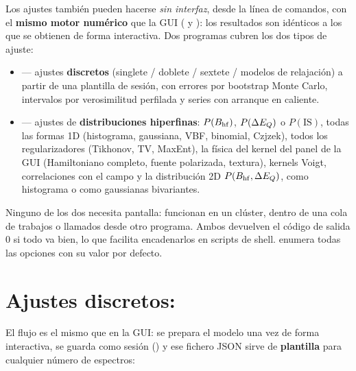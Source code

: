 
Los ajustes también pueden hacerse \emph{sin interfaz}, desde la línea de
comandos, con el \textbf{mismo motor numérico} que la GUI
( y ): los resultados son
idénticos a los que se obtienen de forma interactiva. Dos programas cubren los
dos tipos de ajuste:

\begin{itemize}[nosep]
  \item {} --- ajustes \textbf{discretos}
        (singlete / doblete / sextete / modelos de relajación) a partir de una
        plantilla de sesión, con errores por bootstrap Monte Carlo, intervalos
        por verosimilitud perfilada y series con arranque en caliente.
  \item {} --- ajustes de
        \textbf{distribuciones hiperfinas}: $P(B_{\mathrm{hf}})$, $P(\Delta E_{Q})$ o
        $P(\mathrm{IS})$, todas las formas 1D (histograma, gaussiana, VBF,
        binomial, Czjzek), todos los regularizadores (Tikhonov, TV, MaxEnt), la física
        del kernel del panel de la GUI (Hamiltoniano completo, fuente
        polarizada, textura), kernels Voigt, correlaciones con el campo y la
        distribución 2D $P(B_{\mathrm{hf}},\Delta E_{Q})$, como histograma o como gaussianas
        bivariantes.
\end{itemize}

Ninguno de los dos necesita pantalla: funcionan en un clúster, dentro de una
cola de trabajos o llamados desde otro programa. Ambos devuelven el código de
salida $0$ si todo va bien, lo que facilita encadenarlos en scripts de shell.
 enumera todas las opciones con su valor por defecto.

\section{Ajustes discretos: }
\label{sec:cli-discrete}

El flujo es el mismo que en la GUI: se prepara el modelo una vez de forma
interactiva, se guarda como sesión () y ese
fichero JSON sirve de \textbf{plantilla} para cualquier número de espectros:

